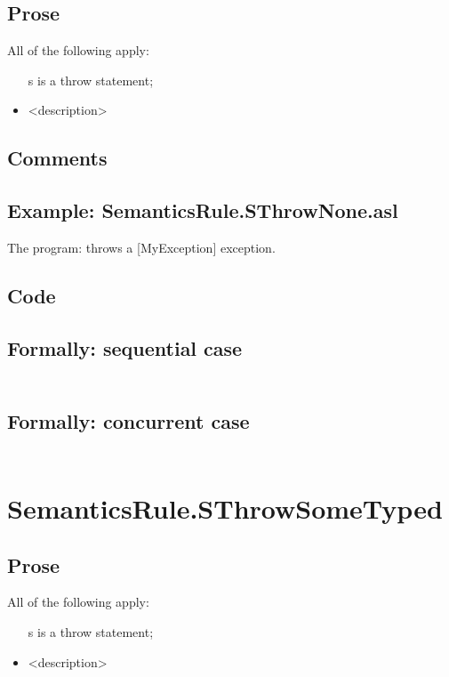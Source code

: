 \documentclass{book}
\begin{document}
    \subsection{Prose}
    All of the following apply:
    \begin{itemize}
    \item [s] is a throw statement;
    \item <description>
    \end{itemize}

    \subsection{Comments}

    \subsection{Example: SemanticsRule.SThrowNone.asl}
    The program:
    throws a [MyException] exception.

  \subsection{Code}

  \subsection{Formally: sequential case}
  \begin{align}
  \end{align} 

  \subsection{Formally: concurrent case}
  \begin{align}
  \end{align} 

\section{SemanticsRule.SThrowSomeTyped \label{sec:SemanticsRule.SThrowSomeTyped}}

    \subsection{Prose}
    All of the following apply:
    \begin{itemize}
    \item [s] is a throw statement;
    \item <description>
    \end{itemize}
\end{document}
